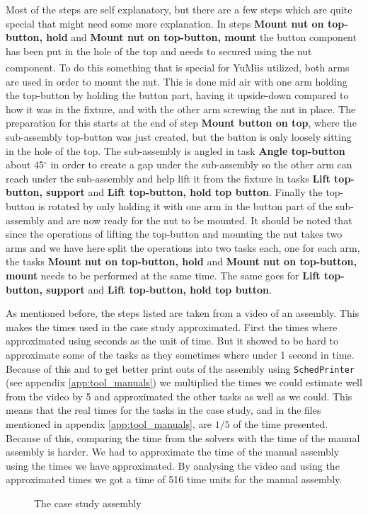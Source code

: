 \noindent Most of the steps are self explanatory, but there are a few steps which are quite special that might need some more explanation. In steps \textbf{Mount nut on top-button, hold} and \textbf{Mount nut on top-button, mount} the button component has been put in the hole of the top and needs to secured using the nut component. To do this something that is special for YuMi\textsuperscript\textregistered is utilized, both arms are used in order to mount the nut. This is done mid air with one arm holding the top-button by holding the button part, having it upside-down compared to how it was in the fixture, and with the other arm screwing the nut in place. The preparation for this starts at the end of step \textbf{Mount button on top}, where the sub-assembly top-button was just created, but the button is only loosely sitting in the hole of the top. The sub-assembly is angled in task \textbf{Angle top-button} about 45$^\circ$ in order to create a gap under the sub-assembly so the other arm can reach under the sub-assembly and help lift it from the fixture in tasks \textbf{Lift top-button, support} and \textbf{Lift top-button, hold top button}. Finally the top-button is rotated by only holding it with one arm in the button part of the sub-assembly and are now ready for the nut to be mounted.
It should be noted that since the operations of lifting the top-button and mounting the nut takes two arms and we have here split the operations into two tasks each, one for each arm, the tasks \textbf{Mount nut on top-button, hold} and \textbf{Mount nut on top-button, mount} needs to be performed at the same time. The same goes for  \textbf{Lift top-button, support} and \textbf{Lift top-button, hold top button}.

As mentioned before, the steps listed are taken from a video of an assembly. This makes the times used in the case study approximated. First the times where approximated using seconds as the unit of time. But it showed to be hard to approximate some of the tasks as they sometimes where under 1 second in time. Because of this and to get better print outs of the assembly using \texttt{SchedPrinter} (see appendix \ref{app:tool_manuals}) we multiplied the times we could estimate well from the video by 5 and approximated the other tasks as well as we could. This means that the real times for the tasks in the case study, and in the files mentioned in appendix \ref{app:tool_manuals}, are $1/5$ of the time presented. Because of this, comparing the time from the solvers with the time of the manual assembly is harder. We had to approximate the time of the manual assembly using the times we have approximated. By analysing the video and using the approximated times we got a time of 516 time units for the manual assembly.

\begin{landscape}
\begin{figure}

\caption{The case study assembly}
\label{fig:assembly}
\end{figure}
\end{landscape}

%